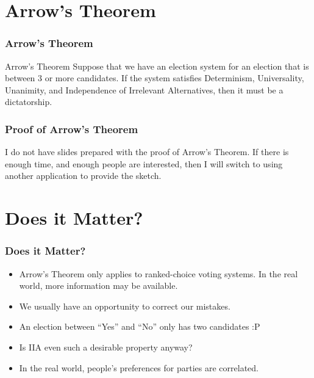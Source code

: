 \documentclass{beamer}
\begin{document}
    \section{Arrow's Theorem}
    \begin{frame}
        \frametitle{Arrow's Theorem}
    
        \begin{block}{Arrow's Theorem}
            Suppose that we have an election system for an election that is between $3$ or more candidates. If the system satisfies \alert{Determinism}, \alert{Universality}, \alert{Unanimity}, and \alert{Independence of Irrelevant Alternatives}, then it must be a dictatorship.
        \end{block}
    
    \end{frame}
    \begin{frame}
        \frametitle{Proof of Arrow's Theorem}
    
        I do not have slides prepared with the proof of Arrow's Theorem. If there is enough time, and enough people are interested, then I will switch to using another application to provide the sketch.
    
    \end{frame}

    \section{Does it Matter?}
    \begin{frame}
        \frametitle{Does it Matter?}

        \begin{itemize}
            \item Arrow's Theorem only applies to ranked-choice voting systems. In the real world, more information may be available. \pause
            \item We usually have an opportunity to correct our mistakes. \pause
            \item An election between ``Yes'' and ``No'' only has two candidates :P \pause
            \item Is IIA even such a desirable property anyway? \pause
            \item In the real world, people's preferences for parties are correlated.
        \end{itemize}
     
    \end{frame}
\end{document}

